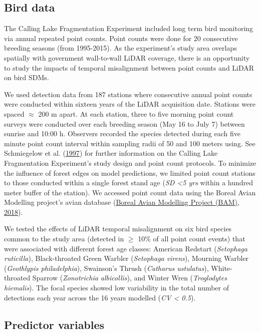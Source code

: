 \documentclass[
  12pt,
]{article}
\begin{document}
\hypertarget{bird-data}{%
\subsection{Bird data}\label{bird-data}}

The Calling Lake Fragmentation Experiment included long term bird monitoring via annual repeated point counts. Point counts were done for 20 consecutive breeding seasons (from 1995-2015). As the experiment's study area overlaps spatially with government wall-to-wall LiDAR coverage, there is an opportunity to study the impacts of temporal misalignment between point counts and LiDAR on bird SDMs.

We used detection data from 187 stations where consecutive annual point counts were conducted within sixteen years of the LiDAR acquisition date. Stations were spaced \(\approx\) 200 m apart. At each station, three to five morning point count surveys were conducted over each breeding season (May 16 to July 7) between sunrise and 10:00 h. Observers recorded the species detected during each five minute point count interval within sampling radii of 50 and 100 meters using. See Schmiegelow et al. (\protect\hyperlink{ref-Schmiegelow1997}{1997}) for further information on the Calling Lake Fragmentation Experiment's study design and point count protocols. To minimize the influence of forest edges on model predictions, we limited point count stations to those conducted within a single forest stand age (\emph{SD \textless5 yrs} within a hundred meter buffer of the station). We accessed point count data using the Boreal Avian Modelling project's avian database (\protect\hyperlink{ref-BAM2018}{Boreal Avian Modelling Project (BAM), 2018}).

We tested the effects of LiDAR temporal misalignment on six bird species common to the study area (detected in \(\ge\) 10\% of all point count events) that were associated with different forest age classes: American Redstart (\emph{Setophaga ruticilla}), Black-throated Green Warbler (\emph{Setophaga virens}), Mourning Warbler (\emph{Geothlypis philadelphia}), Swainson's Thrush (\emph{Catharus ustulatus}), White-throated Sparrow (\emph{Zonotrichia albicollis}), and Winter Wren (\emph{Troglodytes hiemalis}). The focal species showed low variability in the total number of detections each year across the 16 years modelled (\emph{CV \textless{} 0.5}).

\hypertarget{predictor-variables}{%
\subsection{Predictor variables}\label{predictor-variables}}
\end{document}
